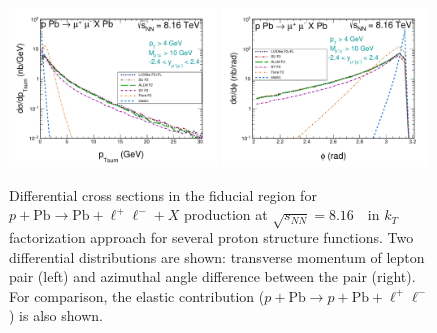 \begin{figure}[!h]
\includegraphics[width=0.49\textwidth]{figures_Marta/ptsum-c.pdf}
 \includegraphics[width=0.49\textwidth]{figures_Marta/phi-c.pdf}
\caption{Differential cross sections in the fiducial region for $p+\textrm{Pb}\rightarrow \textrm{Pb} + \ell^+\ell^- + X$ production at $\sqrt{s_{N N}} = 8.16$~\TeV\ in $k_T$ factorization approach for several proton structure functions.
Two differential distributions are shown: transverse momentum of lepton pair (left) and azimuthal angle difference between the pair (right).
For comparison, the elastic contribution ($p+\textrm{Pb}\rightarrow p+ \textrm{Pb} + \ell^+\ell^-$) is also shown.
}
 \label{fig:kt_figures2}
\end{figure}


